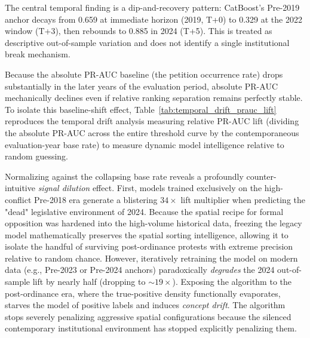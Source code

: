 \documentclass[11pt, letterpaper]{article}
\begin{document}
The central temporal finding is a dip-and-recovery pattern: CatBoost's Pre-2019 anchor decays from 0.659 at immediate horizon (2019, T+0) to 0.329 at the 2022 window (T+3), then rebounds to 0.885 in 2024 (T+5). This is treated as descriptive out-of-sample variation and does not identify a single institutional break mechanism.

\vspace{1em}


\noindent Because the absolute PR-AUC baseline (the petition occurrence rate) drops substantially in the later years of the evaluation period, absolute PR-AUC mechanically declines even if relative ranking separation remains perfectly stable. To isolate this baseline-shift effect, Table~\ref{tab:temporal_drift_prauc_lift} reproduces the temporal drift analysis measuring relative PR-AUC lift (dividing the absolute PR-AUC across the entire threshold curve by the contemporaneous evaluation-year base rate) to measure dynamic model intelligence relative to random guessing.



Normalizing against the collapsing base rate reveals a profoundly counter-intuitive \textit{signal dilution} effect. First, models trained exclusively on the high-conflict Pre-2018 era generate a blistering $34\times$ lift multiplier when predicting the "dead" legislative environment of 2024. Because the spatial recipe for formal opposition was hardened into the high-volume historical data, freezing the legacy model mathematically preserves the spatial sorting intelligence, allowing it to isolate the handful of surviving post-ordinance protests with extreme precision relative to random chance. However, iteratively retraining the model on modern data (e.g., Pre-2023 or Pre-2024 anchors) paradoxically \textit{degrades} the 2024 out-of-sample lift by nearly half (dropping to $\sim 19\times$). Exposing the algorithm to the post-ordinance era, where the true-positive density functionally evaporates, starves the model of positive labels and induces \textit{concept drift}. The algorithm stops severely penalizing aggressive spatial configurations because the silenced contemporary institutional environment has stopped explicitly penalizing them.
\end{document}
